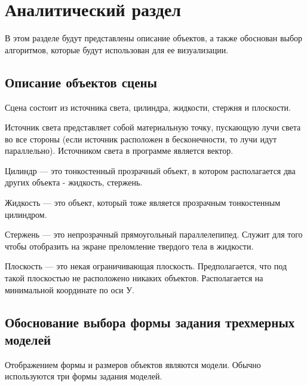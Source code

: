 \chapter{Аналитический раздел}

В этом разделе будут представлены описание объектов, а также обоснован выбор алгоритмов, которые будут использован для ее визуализации.

\section{Описание объектов сцены}

Сцена состоит из источника света, цилиндра, жидкости, стержня и плоскости.

Источник света представляет собой материальную точку, пускающую лучи света во все стороны (если источник расположен в бесконечности, то лучи идут параллельно). Источником света в программе является вектор.
 
Цилиндр --- это тонкостенный прозрачный объект, в котором располагается два других объекта - жидкость, стержень.
  
Жидкость --- это объект, который тоже является прозрачным тонкостенным цилиндром.

Стержень --- это непрозрачный прямоугольный параллелепипед. Служит для того чтобы отобразить на экране преломление твердого тела в жидкости.

Плоскость --- это некая ограничивающая плоскость. Предполагается, что под такой плоскостью не расположено никаких объектов. Располагается на минимальной координате по оси У. 

\section{Обоснование выбора формы задания трехмерных моделей}

Отображением формы и размеров объектов являются модели. 
Обычно используются три формы задания моделей.

